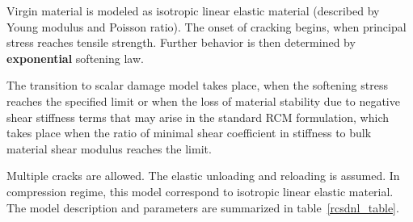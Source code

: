 \documentclass[epsf,a4paper]{article}
\begin{document}
Virgin material is modeled as isotropic linear elastic material
(described by Young modulus and Poisson
ratio). The onset of cracking begins, when principal stress reaches
tensile strength. 
Further behavior is then determined by {\bf exponential} softening law.

The transition to scalar damage model
takes place, when the softening stress reaches the specified limit or
when the loss of material stability due to negative shear stiffness
terms that may arise in the standard RCM formulation, which takes
place when the ratio of minimal shear coefficient in stiffness to
bulk material shear modulus reaches the limit.

Multiple cracks are allowed. 
The elastic unloading and reloading is assumed. 
In compression regime, this model correspond to isotropic linear elastic material.
The model description and parameters are summarized
in table~\ref{rcsdnl_table}.
\end{document}
